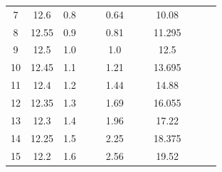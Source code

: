 \documentclass[a4paper,12pt]{article}
\begin{document}
\begin{justify}
\begin{table}[htp]
\begin{tabular}{|c|c|c|c|c|c|c|c|c|c|c|c|}
7  & 12.6  & 0.8 &                        &                          & 0.64  &                          &                         & 10.08      &                           &                        &                        \\ \cline{1-3} \cline{6-6} \cline{9-9}
8  & 12.55 & 0.9 &                        &                          & 0.81  &                          &                         & 11.295     &                           &                        &                        \\ \cline{1-3} \cline{6-6} \cline{9-9}
9  & 12.5  & 1.0 &                        &                          & 1.0   &                          &                         & 12.5       &                           &                        &                        \\ \cline{1-3} \cline{6-6} \cline{9-9}
10 & 12.45 & 1.1 &                        &                          & 1.21  &                          &                         & 13.695     &                           &                        &                        \\ \cline{1-3} \cline{6-6} \cline{9-9}
11 & 12.4  & 1.2 &                        &                          & 1.44  &                          &                         & 14.88      &                           &                        &                        \\ \cline{1-3} \cline{6-6} \cline{9-9}
12 & 12.35 & 1.3 &                        &                          & 1.69  &                          &                         & 16.055     &                           &                        &                        \\ \cline{1-3} \cline{6-6} \cline{9-9}
13 & 12.3  & 1.4 &                        &                          & 1.96  &                          &                         & 17.22      &                           &                        &                        \\ \cline{1-3} \cline{6-6} \cline{9-9}
14 & 12.25 & 1.5 &                        &                          & 2.25  &                          &                         & 18.375     &                           &                        &                        \\ \cline{1-3} \cline{6-6} \cline{9-9}
15 & 12.2  & 1.6 &                        &                          & 2.56  &                          &                         & 19.52      &                           &                        &                        \\ \cline{1-3} \cline{6-6} \cline{9-9}

\end{tabular}
\end{table}
\end{justify}
\end{document}
